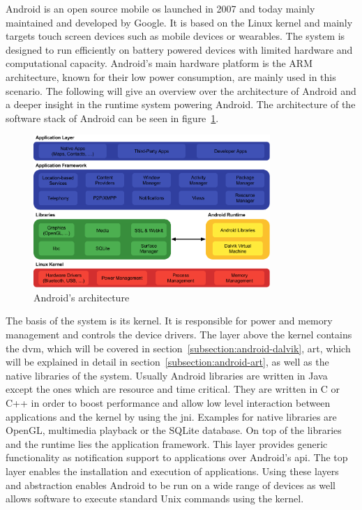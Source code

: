 Android is an open source mobile \gls{os} launched in 2007 and today mainly maintained and developed by Google.
It is based on the Linux kernel and mainly targets touch screen devices such as mobile devices or wearables.
The system is designed to run efficiently on battery powered devices with limited hardware and computational capacity.
Android's main hardware platform is the ARM architecture, known for their low power consumption, are mainly used in this scenario.
The following will give an overview over the architecture of Android and a deeper insight in the runtime system powering Android.
The architecture of the software stack of Android can be seen in figure~\ref{fig:androidArchitecture}.
\newline

\begin{figure}[h]
    \centering
    \includegraphics[width=0.8\textwidth]{data/stack.png}
    \caption{Android's architecture \cite{androidStack}}
    \label{fig:androidArchitecture}
\end{figure}

The basis of the system is its kernel.
It is responsible for power and memory management and controls the device drivers.
\newline
The layer above the kernel contains the \gls{dvm}, which will be covered in section~\ref{subsection:android-dalvik}, \gls{art}, which will be explained in detail in section~\ref{subsection:android-art}, as well as the native libraries of the system.
Usually Android libraries are written in Java except the ones which are resource and time critical.
They are written in C or C++ in order to boost performance and allow low level interaction between applications and the kernel by using the \gls{jni}.
Examples for native libraries are OpenGL, multimedia playback or the SQLite database.
\newline
On top of the libraries and the runtime lies the application framework.
This layer provides generic functionality as notification support to applications over Android's \gls{api}.
\newline
The top layer enables the installation and execution of applications.
\newline
Using these layers and abstraction enables Android to be run on a wide range of devices as well allows software to execute standard Unix commands using the kernel.
